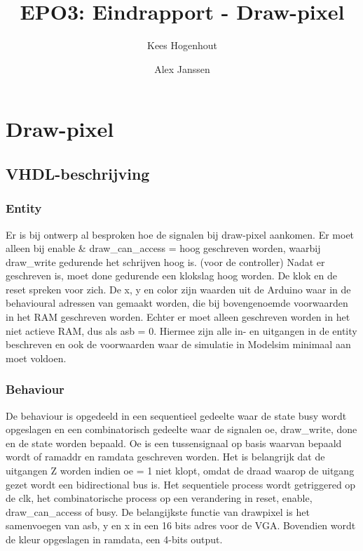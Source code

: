 \documentclass{scrartcl} %
\author{Kees Hogenhout \and Alex Janssen}
\title{EPO3: Eindrapport - Draw-pixel}
\begin{document}
\section{Draw-pixel}
\label{sec:draw-fill}

\subsection{VHDL-beschrijving}
\subsubsection{Entity}
Er is bij ontwerp al besproken hoe de signalen bij draw-pixel aankomen. Er moet alleen bij enable \& draw\_can\_access = hoog geschreven worden, waarbij draw\_write gedurende het schrijven hoog is. (voor de controller)  Nadat er geschreven is, moet done gedurende een klokslag hoog worden. De klok en de reset spreken voor zich. De x, y en color zijn waarden uit de Arduino waar in de behavioural adressen van gemaakt worden, die bij bovengenoemde voorwaarden in het RAM geschreven worden. Echter er moet alleen geschreven worden in het niet actieve RAM, dus als asb = 0.  Hiermee zijn alle in- en uitgangen in de entity beschreven en ook de voorwaarden waar de simulatie in Modelsim minimaal aan moet voldoen. 

\subsubsection{Behaviour}
De behaviour is opgedeeld in een sequentieel gedeelte waar de state busy wordt opgeslagen en een combinatorisch gedeelte waar de signalen oe, draw\_write, done en de state worden bepaald. Oe is een tussensignaal op basis waarvan bepaald wordt of ramaddr en ramdata geschreven worden. Het is belangrijk dat de uitgangen Z worden indien oe = 1 niet klopt, omdat de draad waarop de uitgang gezet wordt een bidirectional bus is. Het sequentiele process wordt getriggered op de clk, het combinatorische process op een verandering in reset, enable, draw\_can\_access of busy. De belangijkste functie
van drawpixel is het samenvoegen van asb, y en x in een 16 bits adres voor de VGA. Bovendien wordt de kleur opgeslagen in ramdata, een 4-bits output. 
\end{document}
